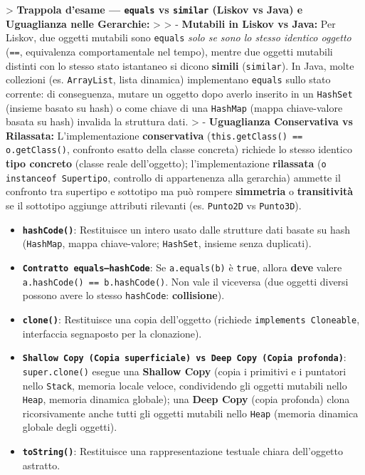    > \textbf{Trappola d'esame — \texttt{equals} vs \texttt{similar} (Liskov vs Java) e Uguaglianza nelle Gerarchie:}    >    > - \textbf{Mutabili in Liskov vs Java:} Per Liskov, due oggetti mutabili sono \texttt{equals} \emph{solo se sono lo stesso identico oggetto} (\texttt{==}, equivalenza comportamentale nel tempo), mentre due oggetti mutabili distinti con lo stesso stato istantaneo si dicono \textbf{simili} (\texttt{similar}). In Java, molte collezioni (es. \texttt{ArrayList}, lista dinamica) implementano \texttt{equals} sullo stato corrente: di conseguenza, mutare un oggetto dopo averlo inserito in un \texttt{HashSet} (insieme basato su hash) o come chiave di una \texttt{HashMap} (mappa chiave-valore basata su hash) invalida la struttura dati.    > - \textbf{Uguaglianza Conservativa vs Rilassata:} L'implementazione \textbf{conservativa} (\texttt{this.getClass() == o.getClass()}, confronto esatto della classe concreta) richiede lo stesso identico \textbf{tipo concreto} (classe reale dell'oggetto); l'implementazione \textbf{rilassata} (\texttt{o instanceof Supertipo}, controllo di appartenenza alla gerarchia) ammette il confronto tra supertipo e sottotipo ma può rompere \textbf{simmetria} o \textbf{transitività} se il sottotipo aggiunge attributi rilevanti (es. \texttt{Punto2D} vs \texttt{Punto3D}).

\begin{itemize}

\item \textbf{\texttt{hashCode()}}: Restituisce un intero usato dalle strutture dati basate su hash (\texttt{HashMap}, mappa chiave-valore; \texttt{HashSet}, insieme senza duplicati).

\item \textbf{\texttt{Contratto equals–hashCode}}: Se \texttt{a.equals(b)} è \texttt{true}, allora \textbf{deve} valere \texttt{a.hashCode() == b.hashCode()}. Non vale il viceversa (due oggetti diversi possono avere lo stesso \texttt{hashCode}: \textbf{collisione}).



\item \textbf{\texttt{clone()}}: Restituisce una copia dell'oggetto (richiede \texttt{implements Cloneable}, interfaccia segnaposto per la clonazione).

\item \textbf{\texttt{Shallow Copy (Copia superficiale) vs Deep Copy (Copia profonda)}}: \texttt{super.clone()} esegue una \textbf{Shallow Copy} (copia i primitivi e i puntatori nello \texttt{Stack}, memoria locale veloce, condividendo gli oggetti mutabili nello \texttt{Heap}, memoria dinamica globale); una \textbf{Deep Copy} (copia profonda) clona ricorsivamente anche tutti gli oggetti mutabili nello \texttt{Heap} (memoria dinamica globale degli oggetti).



\item \textbf{\texttt{toString()}}: Restituisce una rappresentazione testuale chiara dell'oggetto astratto.

\end{itemize}

